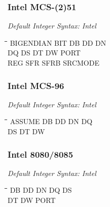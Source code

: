\subsubsection{Intel MCS-(2)51}

{\em Default Integer Syntax: Intel}

{\tt\begin{tabbing}
\hspace{3cm}\=\hspace{3cm}\=\hspace{3cm}\=\hspace{3cm}\=\kill
BIGENDIAN  \> BIT         \> DB          \> DD          \> DN \\
DQ         \> DS          \> DT          \> DW          \> PORT \\
REG        \> SFR         \> SFRB        \> SRCMODE \\
\end{tabbing}}

\subsubsection{Intel MCS-96}

{\em Default Integer Syntax: Intel}

{\tt\begin{tabbing}
\hspace{3cm}\=\hspace{3cm}\=\hspace{3cm}\=\hspace{3cm}\=\kill
ASSUME     \> DB          \> DD          \> DN          \> DQ \\
DS         \> DT          \> DW \\
\end{tabbing}}
 
\subsubsection{Intel 8080/8085}

{\em Default Integer Syntax: Intel}

{\tt\begin{tabbing}
\hspace{3cm}\=\hspace{3cm}\=\hspace{3cm}\=\hspace{3cm}\=\kill
DB         \> DD          \> DN          \> DQ          \> DS \\
DT         \> DW          \> PORT \\
\end{tabbing}}

